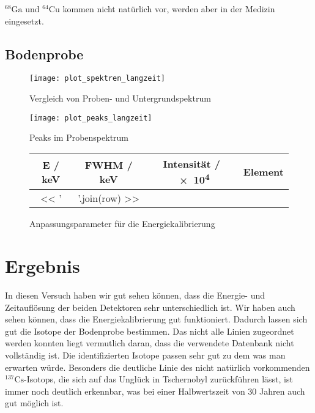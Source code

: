 \documentclass[11pt, ngerman, fleqn, DIV=15, headinclude, BCOR=2cm]{scrreprt}
\newcommand{\plotwidth}{0.8\linewidth}
\begin{document}
$^{68}\text{Ga}$ und $^{64}\text{Cu}$ kommen nicht natürlich vor, werden aber
in der Medizin eingesetzt.


\section{Bodenprobe}


\begin{figure}
	\centering
	\texttt{[image: plot\_spektren\_langzeit]}
	\caption{%
		Vergleich von Proben- und Untergrundspektrum
	}
	\label{fig:langzeit_probe_untergrund}
\end{figure}


\begin{figure}
	\centering
	\texttt{[image: plot\_peaks\_langzeit]}
	\caption{%
		Peaks im Probenspektrum
	}
	\label{fig:langzeit_probe_peaks}
\end{figure}



\begin{figure}[h]
	\centering
	\begin{tabular}{SSSl}
		{E / \si{\kilo\electronvolt}} &
		{FWHM / \si{\kilo\electronvolt}} &
            {Intensität / \num{e4}} &
            {Element}\\
		\midrule
		<< ' & '.join(row) >> \\
	\end{tabular}
	\caption{%
		Anpassungsparameter für die Energiekalibrierung
	}
	\label{tab:energiekalibrierung}
\end{figure}


\chapter{Ergebnis}

In diesen Versuch haben wir gut sehen können, dass die Energie- und Zeitauflösung der
beiden Detektoren sehr unterschiedlich ist. Wir haben auch sehen können, dass
die Energiekalibrierung gut funktioniert. 
Dadurch lassen sich gut die Isotope der Bodenprobe bestimmen. Das nicht
alle Linien zugeordnet werden konnten liegt vermutlich daran, dass die
verwendete Datenbank nicht vollständig ist. Die identifizierten Isotope passen
sehr gut zu dem was man erwarten würde. Besonders die deutliche Linie des
nicht natürlich vorkommenden $^{137}\text{Cs}$-Isotops, die sich auf das Unglück
in Tschernobyl zurückführen lässt, ist immer noch deutlich erkennbar, was bei
einer Halbwertszeit von 30 Jahren auch gut möglich ist.
\end{document}
